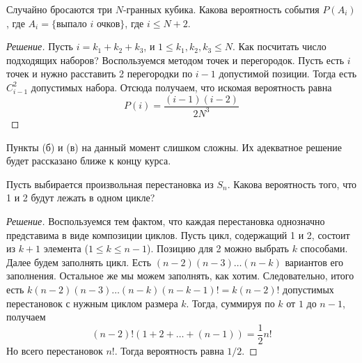 \documentclass[a4paper,12pt]{article}
\begin{document}
\begin{problem}
	Случайно бросаются три \(N\)-гранных кубика. Какова вероятность события \(P(A_i)\), где \(A_i = \{\text{выпало }i\text{ очков}\}\), где \(i \leq N + 2\).
\end{problem}
\begin{proof}[Решение]
	Пусть \(i = k_1 + k_2 + k_3\), и \(1 \leq k_1, k_2, k_3 \leq N\). Как посчитать число подходящих наборов? Воспользуемся методом точек и перегородок. Пусть есть \(i\) точек и нужно расставить 2 перегородки по \(i - 1\) допустимой позиции. Тогда есть \(C_{i - 1}^{2}\) допустимых набора. Отсюда получаем, что искомая вероятность равна \[P(i) = \frac{(i - 1)(i - 2)}{2N^3}\]
\end{proof}
\begin{remark}
	Пункты (б) и (в) на данный момент слишком сложны. Их адекватное решение будет рассказано ближе к концу курса.
\end{remark}

\begin{problem}
	Пусть выбирается произвольная перестановка из \(S_n\). Какова вероятность того, что 1 и 2 будут лежать в одном цикле?
\end{problem}
\begin{proof}[Решение]
	Воспользуемся тем фактом, что каждая перестановка однозначно представима в виде композиции циклов. Пусть цикл, содержащий 1 и 2, состоит из \(k + 1\) элемента (\(1 \leq k \leq n - 1\)). Позицию для 2 можно выбрать \(k\) способами. Далее будем заполнять цикл. Есть \((n - 2)(n - 3)\ldots(n - k)\) вариантов его заполнения. Остальное же мы можем заполнять, как хотим. Следовательно, итого есть \(k(n - 2)(n - 3)\ldots(n - k)(n - k - 1)! = k(n - 2)!\) допустимых перестановок с нужным циклом размера \(k\). Тогда, суммируя по \(k\) от \(1\) до \(n - 1\), получаем
	\[(n - 2)!(1 + 2 + \ldots + (n - 1)) = \frac{1}{2}n!\]
	Но всего перестановок \(n!\). Тогда вероятность равна \(1/2\). 
\end{proof}
\end{document}
